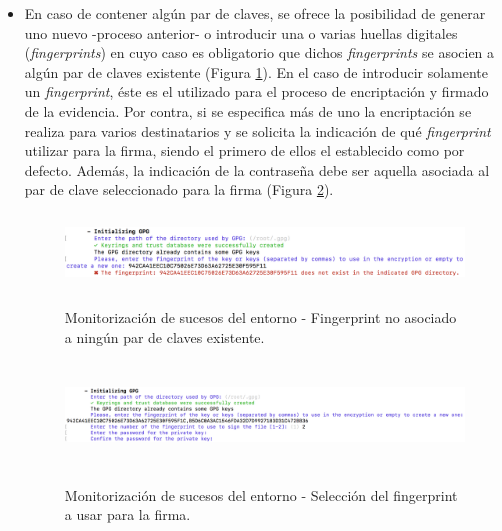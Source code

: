 \documentclass[12pt,a4paper, twoside]{report}
\begin{document}
\begin{itemize}
\begin{itemize}
	 			\item En caso de contener algún par de claves, se ofrece la posibilidad de generar uno nuevo -proceso anterior- o introducir una o varias huellas digitales (\textit{fingerprints}) en cuyo caso es obligatorio que dichos \textit{fingerprints} se asocien a algún par de claves existente (Figura \ref{fig:userguide_monitoring_gpg_fingerprintError}). En el caso de introducir solamente un \textit{fingerprint}, éste es el utilizado para el proceso de encriptación y firmado de la evidencia. Por contra, si se especifica más de uno la encriptación se realiza para varios destinatarios y se solicita la indicación de qué \textit{fingerprint} utilizar para la firma, siendo el primero de ellos el establecido como por defecto. Además, la indicación de la contraseña debe ser aquella asociada al par de clave seleccionado para la firma (Figura \ref{fig:userguide_monitoring_gpg_fingerprint_sign}).
	 			
	 		\begin{figure}[!ht]   
				\caption{Monitorización de sucesos del entorno - Fingerprint no asociado a ningún par de claves existente.} 
				\begin{center} 
					\includegraphics[width=16cm,height=2cm]{Images/userGuide/monitoring/gpgFingerprintError} \\
					\label{fig:userguide_monitoring_gpg_fingerprintError} 
				\end{center}  
			\end{figure}
			
			\begin{figure}[!ht]   
				\caption{Monitorización de sucesos del entorno - Selección del fingerprint a usar para la firma.} 
				\begin{center} 
					\includegraphics[width=16cm,height=2.8cm]{Images/userGuide/monitoring/gpgFingerprintSign} \\
					\label{fig:userguide_monitoring_gpg_fingerprint_sign} 
				\end{center}  
			\end{figure}
	 			

\end{itemize}
\end{itemize}
\end{document}

